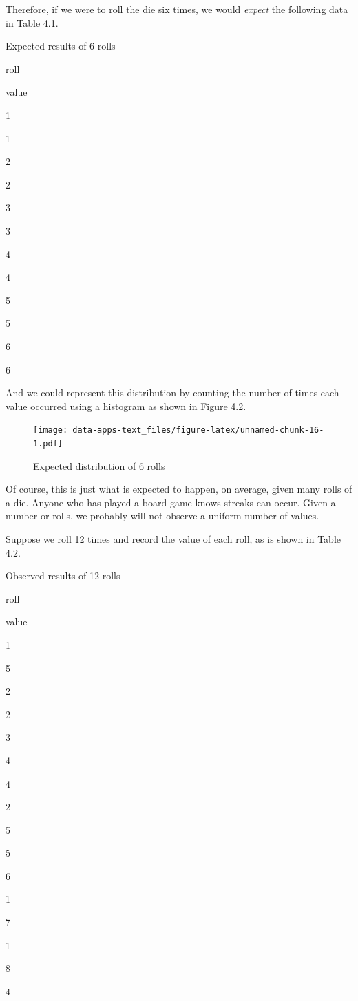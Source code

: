 \documentclass[
]{book}
\begin{document}
Therefore, if we were to roll the die six times, we would \emph{expect} the following data in Table 4.1.

\label{tab:unnamed-chunk-15}Expected results of 6 rolls

roll

value

1

1

2

2

3

3

4

4

5

5

6

6

And we could represent this distribution by counting the number of times each value occurred using a histogram as shown in Figure 4.2.

\begin{figure}
\centering
\texttt{[image: data-apps-text\_files/figure-latex/unnamed-chunk-16-1.pdf]}
\caption{\label{fig:unnamed-chunk-16}Expected distribution of 6 rolls}
\end{figure}

Of course, this is just what is expected to happen, on average, given many rolls of a die. Anyone who has played a board game knows streaks can occur. Given a number or rolls, we probably will not observe a uniform number of values.

Suppose we roll 12 times and record the value of each roll, as is shown in Table 4.2.

\label{tab:unnamed-chunk-18}Observed results of 12 rolls

roll

value

1

5

2

2

3

4

4

2

5

5

6

1

7

1

8

4
\end{document}
